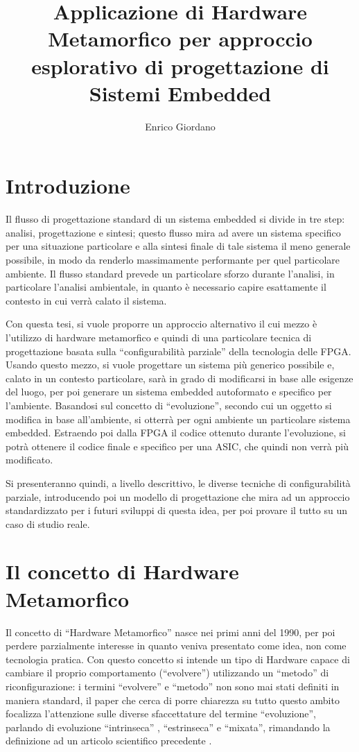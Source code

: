 \documentclass[11pt]{article} %
\title{Applicazione di Hardware Metamorfico per approccio esplorativo di progettazione di Sistemi Embedded}
\author{Enrico Giordano}
\date{} %
\begin{document}
\maketitle

\section{Introduzione}

Il flusso di progettazione standard di un sistema embedded si divide in tre step: analisi, progettazione e sintesi; questo flusso mira ad avere un sistema specifico per una situazione particolare e alla sintesi finale di tale sistema il meno generale possibile, in modo da renderlo massimamente performante per quel particolare ambiente. Il flusso standard prevede un particolare sforzo durante l'analisi, in particolare l'analisi ambientale, in quanto è necessario capire esattamente il contesto in cui verrà calato il sistema.

Con questa tesi, si vuole proporre un approccio alternativo il cui mezzo è l'utilizzo di hardware metamorfico e quindi di una particolare tecnica di progettazione basata sulla ``configurabilità parziale'' della tecnologia delle FPGA. Usando questo mezzo, si vuole progettare un sistema più generico possibile e, calato in un contesto particolare, sarà in grado di modificarsi in base alle esigenze del luogo, per poi generare un sistema embedded autoformato e specifico per l'ambiente. Basandosi sul concetto di ``evoluzione'', secondo cui un oggetto si modifica in base all'ambiente, si otterrà per ogni ambiente un particolare sistema embedded. Estraendo poi dalla FPGA il codice ottenuto durante l'evoluzione, si potrà ottenere il codice finale e specifico per una ASIC, che quindi non verrà più modificato.

Si presenteranno quindi, a livello descrittivo, le diverse tecniche di configurabilità parziale, introducendo poi un modello di progettazione che mira ad un approccio standardizzato per i futuri sviluppi di questa idea, per poi provare il tutto su un caso di studio reale.

\section{Il concetto di Hardware Metamorfico}

Il concetto di ``Hardware Metamorfico'' nasce nei primi anni del 1990, per poi perdere parzialmente interesse in quanto veniva presentato come idea, non come tecnologia pratica. Con questo concetto si intende un tipo di Hardware capace di cambiare il proprio comportamento (``evolvere'') utilizzando un ``metodo'' di riconfigurazione: i termini ``evolvere'' e ``metodo'' non sono mai stati definiti in maniera standard, il paper che cerca di porre chiarezza su tutto questo ambito \cite{MS1} focalizza l'attenzione sulle diverse sfaccettature del termine ``evoluzione'', parlando di evoluzione ``intrinseca'' , ``estrinseca'' e ``mixata'', rimandando la definizione ad un articolo scientifico precedente \cite{EIE}.
\end{document}
